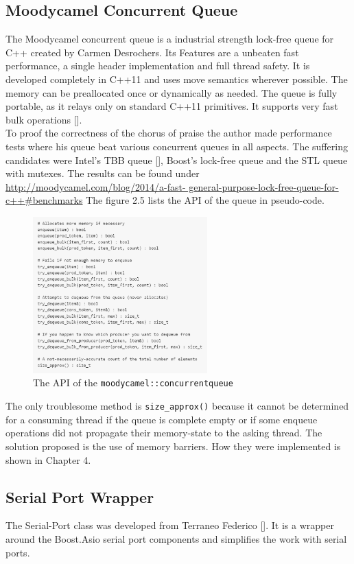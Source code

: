 \subsection{Moodycamel Concurrent Queue}
The Moodycamel concurrent queue is a industrial strength lock-free queue for C++ created by Carmen Desrochers. Its Features are a unbeaten fast performance, a single header implementation and full thread safety. It is developed completely in C++11 and uses move semantics wherever possible. The memory can be preallocated once or dynamically as needed. The queue is fully portable, as it relays only on standard C++11 primitives. It supports very fast bulk operations [].\\
To proof the correctness of the chorus of praise the author made performance tests where his queue beat various concurrent queues in all aspects. The suffering candidates were Intel's TBB queue [], Boost's lock-free queue and the STL queue with mutexes. The results can be found under \url{http://moodycamel.com/blog/2014/a-fast-
general-purpose-lock-free-queue-for-c++#benchmarks} The figure 2.5 lists the API of the queue in pseudo-code.
\begin{figure}[h]
\centering
      \includegraphics[width=0.6\textwidth]{moody}
        \caption{The API of the \texttt{moodycamel::concurrentqueue}}
\end{figure}
The only troublesome method is \texttt{size\_approx()} because it cannot be determined for a consuming thread if the queue is complete empty or if some enqueue operations did not propagate their memory-state to the asking thread. The solution proposed is the use of memory barriers. How they were implemented is shown in Chapter 4.
\subsection{Serial Port Wrapper}
The Serial-Port class was developed from Terraneo Federico []. It is a wrapper around the Boost.Asio serial port components and simplifies the work with serial ports. 